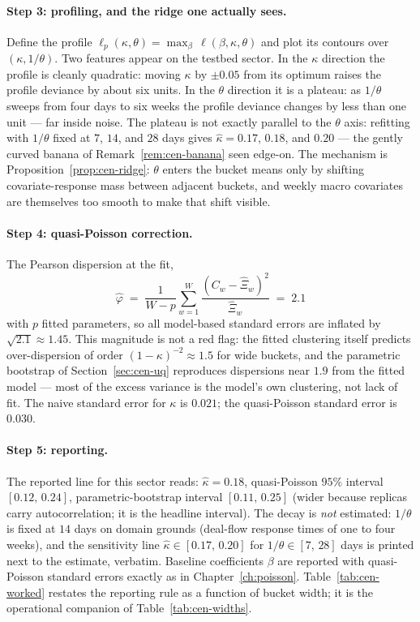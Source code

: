 \paragraph{Step 3: profiling, and the ridge one actually sees.}
Define the profile $\ell_p(\kappa, \theta) = \max_\beta\, \ell(\beta, \kappa, \theta)$
and plot its contours over $(\kappa, 1/\theta)$. Two features appear on the testbed
sector. In the $\kappa$ direction the profile is cleanly quadratic: moving $\kappa$ by
$\pm 0.05$ from its optimum raises the profile deviance by about six units. In the
$\theta$ direction it is a plateau: as $1/\theta$ sweeps from four days to six weeks the
profile deviance changes by less than one unit --- far inside noise. The plateau is not
exactly parallel to the $\theta$ axis: refitting with $1/\theta$ fixed at $7$, $14$, and
$28$ days gives $\hat\kappa = 0.17$, $0.18$, and $0.20$ --- the gently curved banana of
Remark~\ref{rem:cen-banana} seen edge-on. The mechanism is
Proposition~\ref{prop:cen-ridge}: $\theta$ enters the bucket means only by shifting
covariate-response mass between adjacent buckets, and weekly macro covariates are
themselves too smooth to make that shift visible.

\paragraph{Step 4: quasi-Poisson correction.}
The Pearson dispersion at the fit,
\begin{equation}
\label{eq:cen-disp}
\hat\varphi \;=\; \frac{1}{W - p} \sum_{w=1}^{W}
\frac{(C_w - \hat\Xi_w)^2}{\hat\Xi_w} \;=\; 2.1
\end{equation}
with $p$ fitted parameters, so all model-based standard errors are inflated by
$\sqrt{2.1} \approx 1.45$. This magnitude is not a red flag: the fitted clustering itself
predicts over-dispersion of order $(1-\kappa)^{-2} \approx 1.5$ for wide buckets, and the
parametric bootstrap of Section~\ref{sec:cen-uq} reproduces dispersions near $1.9$ from
the fitted model --- most of the excess variance is the model's own clustering, not lack
of fit. The naive standard error for $\kappa$ is $0.021$; the quasi-Poisson standard
error is $0.030$.

\paragraph{Step 5: reporting.}
The reported line for this sector reads: $\hat\kappa = 0.18$, quasi-Poisson $95\%$
interval $[0.12,\, 0.24]$, parametric-bootstrap interval $[0.11,\, 0.25]$ (wider because
replicas carry autocorrelation; it is the headline interval). The decay is \emph{not}
estimated: $1/\theta$ is fixed at $14$ days on domain grounds (deal-flow response times
of one to four weeks), and the sensitivity line $\hat\kappa \in [0.17,\, 0.20]$ for
$1/\theta \in [7,\, 28]$ days is printed next to the estimate, verbatim. Baseline
coefficients $\beta$ are reported with quasi-Poisson standard errors exactly as in
Chapter~\ref{ch:poisson}. Table~\ref{tab:cen-worked} restates the reporting rule as a
function of bucket width; it is the operational companion of
Table~\ref{tab:cen-widths}.


